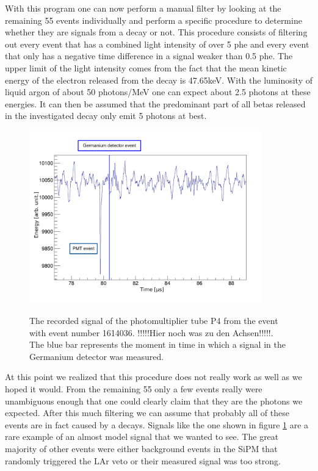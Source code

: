 With this program one can now perform a manual filter by looking at the remaining 55 events individually and perform a specific procedure to determine whether they are signals from a \Kr decay or not.
This procedure consists of filtering out every event that has a combined light intensity of over 5 phe and every event that only has a negative time difference in a signal weaker than 0.5 phe.
The upper limit of the light intensity comes from the fact that the mean kinetic energy of the electron released from the decay is 47.65keV. 
With the luminosity of liquid argon of about 50 photons/MeV one can expect about 2.5 photons at these energies. 
It can then be assumed that the predominant part of all betas released in the investigated decay only emit 5 photons at best.
\\

\begin{figure}[t!]
	\centering
	\ifmakefigures%
	\includegraphics[width=100mm]{./Bilder/BeispielSignal.pdf}
	\fi%
	\label{fig:Trigger4}
	\caption{
    The recorded signal of the photomultiplier tube P4 from the event with event number 1614036. !!!!!Hier noch was zu den Achsen!!!!!. 
    The blue bar represents the moment in time in which a signal in the Germanium detector was measured.
	}
\end{figure}

At this point we realized that this procedure does not really work as well as we hoped it would.
From the remaining 55 only a few events really were unambiguous enough that one could clearly claim that they are the photons we expected.
After this much filtering we can assume that probably all of these events are in fact caused by a \Kr decays.
Signals like the one shown in figure \ref{fig:Trigger4} are a rare example of an almost model signal that we wanted to see.
The great majority of other events were either background events in the SiPM that randomly triggered the LAr veto or their measured signal was too strong.  
\\

